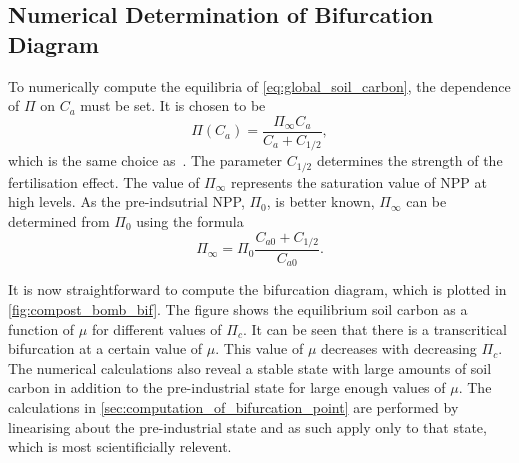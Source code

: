\subsection{Numerical Determination of Bifurcation Diagram}

To numerically compute the equilibria of \cref{eq:global_soil_carbon}, the dependence of $\Pi$ on
$C_a$  must be set. It is chosen to be
\begin{equation}
  \label{eq:npp_fertilization}
  \Pi(C_a) = \frac{\Pi_{\infty} C_a}{C_a + C_{1/2}},
\end{equation}
which is the same choice as~\cite{Cox2006}. The parameter $C_{1/2}$ determines the strength of the  fertilisation effect. The value of $\Pi_{\infty}$
represents the saturation value of NPP at high  levels. As the pre-indsutrial NPP, $\Pi_0$, is better known, $\Pi_{\infty}$  can be determined from $\Pi_0$ using
the formula
\begin{equation}
  \label{eq:npp_saturation_from_pi}
  \Pi_{\infty} = \Pi_0 \frac{C_{a0} + C_{1/2}}{C_{a0}}.
\end{equation}


It is now straightforward to compute the bifurcation diagram, which is plotted in \cref{fig:compost_bomb_bif}. The figure shows the equilibrium soil carbon as a function
of $\mu$ for different values of $\Pi_c$. It can be seen that there is a transcritical bifurcation at a certain value of $\mu$. This value of $\mu$ decreases with decreasing $\Pi_c$.
The numerical calculations also reveal a stable state with large amounts of soil carbon in addition to the pre-industrial state for large enough values of $\mu$. The calculations in
\cref{sec:computation_of_bifurcation_point} are performed by linearising about the pre-industrial state and as such apply only to that state, which is most scientificially relevent.


